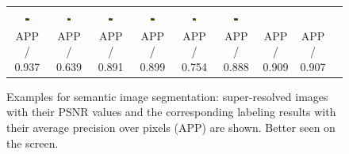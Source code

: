 \begin{figure} [tb]
\begin{tabular*}{\textwidth}{ccccccccc}
\includegraphics[width=0.12\textwidth]{./SR4VT/images/3_22_s_Z_lmnn_5_label.jpg}& 
\includegraphics[width=0.12\textwidth]{./SR4VT/images/3_22_s_R_lmnn_5_label.jpg} &
\includegraphics[width=0.12\textwidth]{./SR4VT/images/3_22_s_S_lmnn_5_label.jpg} &
\includegraphics[width=0.12\textwidth]{./SR4VT/images/3_22_s_A_lmnn_5_label.jpg} &
\includegraphics[width=0.12\textwidth]{./SR4VT/images/3_22_s_J_lmnn_5_label.jpg} &
\includegraphics[width=0.12\textwidth]{./SR4VT/images/3_22_s_A_lmnn_5_label.jpg}  \\
\scriptsize{APP / 0.937} & \scriptsize{APP / 0.639} & \scriptsize{APP / 0.891} & \scriptsize{APP / 0.899}
& \scriptsize{APP / 0.754} & \scriptsize{APP / 0.888} & \scriptsize{APP / 0.909} & \scriptsize{APP / 0.907} \\

\end{tabular*}
\caption{Examples for semantic image segmentation: super-resolved images with their
  PSNR values and the corresponding labeling results
  with their average precision over pixels (APP) are shown. Better seen on the screen.}
\label{sr:fig:example:il}
\end{figure}



